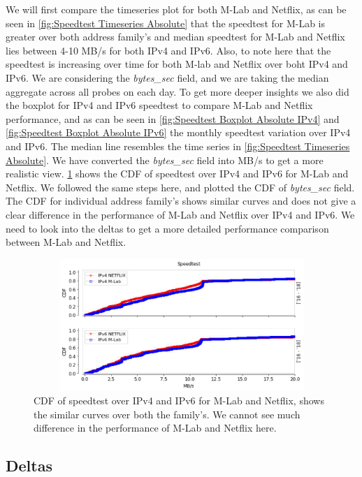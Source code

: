We will first compare the timeseries plot for both M-Lab and Netflix, as can be seen in \cref{fig:Speedtest Timeseries Absolute} that the speedtest for M-Lab is greater over both address family's and median speedtest
for M-Lab and Netflix lies between 4-10 MB/s for both IPv4 and IPv6. Also, to note here that the speedtest is increasing over time for both M-lab and Netflix over boht IPv4 and IPv6.
We are considering the \textit{bytes\_sec} field, and we are taking the median aggregate across all probes on each day. To get more deeper insights
we also did the boxplot for IPv4 and IPv6 speedtest to compare M-Lab and Netflix performance, and as can be seen in \cref{fig:Speedtest Boxplot Absolute IPv4} and \cref{fig:Speedtest Boxplot Absolute IPv6} 
the monthly speedtest variation over IPv4 and IPv6. The median line resembles the time series in \cref{fig:Speedtest Timeseries Absolute}. We have 
converted the \textit{bytes\_sec} field into MB/s to get a more realistic view. \cref{fig:Speedtest CDF Absolute} shows the CDF of
speedtest over IPv4 and IPv6 for M-Lab and Netflix. We followed the same steps here,
and plotted the CDF of \textit{bytes\_sec} field. The CDF for individual address family's shows similar curves and does not give a clear difference
in the performance of M-Lab and Netflix over IPv4 and IPv6. 
We need to look into the deltas to get a more detailed performance comparison between M-Lab and Netflix.

\begin{figure}[!ht]
	\centering
	\includegraphics[keepaspectratio, height=5cm, width=15cm]{figures/mlab/netflix-throughput-difference-speedtest-separate.pdf}
	\caption[Speedtest CDF Absolute]{CDF of speedtest over IPv4 and IPv6 for M-Lab and Netflix, shows the similar curves over both the family's. We cannot see much difference in the performance of M-Lab and Netflix here.}
	\label{fig:Speedtest CDF Absolute}
\end{figure}

\FloatBarrier

\subsection*{Deltas}

